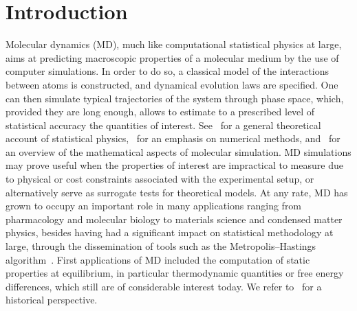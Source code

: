 \section{Introduction}\label{04:intro}
Molecular dynamics (MD), much like computational statistical physics at large, aims at predicting macroscopic properties of a molecular medium by the use of computer simulations. In order to do so, a classical model of the interactions between atoms is constructed, and dynamical evolution laws are specified.
One can then simulate typical trajectories of the system through phase space, which,  provided they are long enough, allows to estimate to a prescribed level of statistical accuracy the quantities of interest. See~\cite{B91} for a general theoretical account of statistical physics,~\cite{T10,AT17,FS01} for an emphasis on numerical methods, and~\cite{LM15} for an overview of the mathematical aspects of molecular simulation.
MD simulations may prove useful when the properties of interest are impractical to measure due to physical or cost constraints associated with the experimental setup, or alternatively serve as surrogate tests for theoretical models. At any rate, MD has grown to occupy an important role in many applications ranging from pharmacology and molecular biology to materials science and condensed matter physics, besides having had a significant impact on statistical methodology at large, through the dissemination of tools such as the Metropolis--Hastings algorithm~\cite{MRTT53}.
First applications of MD included the computation of static properties at equilibrium, in particular thermodynamic quantities or free energy differences, which still are of considerable interest today. We refer to~\cite{CKS05} for a historical perspective.

